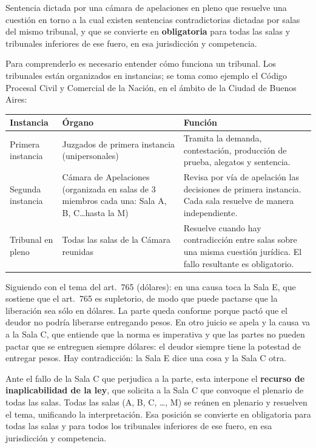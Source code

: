 \documentclass[12pt,oneside]{book}
\begin{document}
\begin{definicion}
Sentencia dictada por una cámara de apelaciones en pleno que resuelve una cuestión en torno a la cual existen sentencias contradictorias dictadas por salas del mismo tribunal, y que se convierte en \textbf{obligatoria} para todas las salas y tribunales inferiores de ese fuero, en esa jurisdicción y competencia.
\end{definicion}

Para comprenderlo es necesario entender cómo funciona un tribunal. Los tribunales están organizados en instancias; se toma como ejemplo el Código Procesal Civil y Comercial de la Nación, en el ámbito de la Ciudad de Buenos Aires:

\begin{table}[H]
\centering
\begin{tabularx}{\textwidth}{>{\raggedright\arraybackslash}p{} >{\raggedright\arraybackslash}p{} >{\raggedright\arraybackslash}X}
\toprule
\textbf{Instancia} & \textbf{Órgano} & \textbf{Función} \\
\midrule
Primera instancia & Juzgados de primera instancia (unipersonales) & Tramita la demanda, contestación, producción de prueba, alegatos y sentencia. \\
\addlinespace
Segunda instancia & Cámara de Apelaciones (organizada en salas de 3 miembros cada una: Sala A, B, C\ldots hasta la M) & Revisa por vía de apelación las decisiones de primera instancia. Cada sala resuelve de manera independiente. \\
\addlinespace
Tribunal en pleno & Todas las salas de la Cámara reunidas & Resuelve cuando hay contradicción entre salas sobre una misma cuestión jurídica. El fallo resultante es obligatorio. \\
\bottomrule
\end{tabularx}
\end{table}

\begin{ejemplo}
Siguiendo con el tema del art.~765 (dólares): en una causa toca la Sala E, que sostiene que el art.~765 es supletorio, de modo que puede pactarse que la liberación sea sólo en dólares. La parte queda conforme porque pactó que el deudor no podría liberarse entregando pesos. En otro juicio se apela y la causa va a la Sala C, que entiende que la norma es imperativa y que las partes no pueden pactar que se entreguen siempre dólares: el deudor siempre tiene la potestad de entregar pesos. Hay contradicción: la Sala E dice una cosa y la Sala C otra.

Ante el fallo de la Sala C que perjudica a la parte, esta interpone el \textbf{recurso de inaplicabilidad de la ley}, que solicita a la Sala C que convoque el plenario de todas las salas. Todas las salas (A, B, C, \ldots, M) se reúnen en plenario y resuelven el tema, unificando la interpretación. Esa posición se convierte en obligatoria para todas las salas y para todos los tribunales inferiores de ese fuero, en esa jurisdicción y competencia.
\end{ejemplo}
\end{document}
